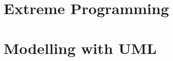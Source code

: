 \documentclass[]{UCD_CS_FYP_Report}
\begin{document}
\maketitle

\tableofcontents{}\newpage
\newpage

\chapter{Extreme Programming}


\chapter{Modelling with UML}


% 

% 

% 

% 

% 

\newpage


\label{endpage}
\end{document}
